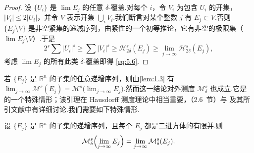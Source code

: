 \begin{proof}
设 $\{U_i\}$ 是 $\lim E_j$ 的任意 $\delta$-覆盖.对每个 $i$，令 $V_i$ 为包含 $U_i$ 的开集，$|V_i|\leq 2|U_i|$，并令 $V$ 表示开集 $\bigcup_{i}V_i$.我们断言对某个整数 $j$ 有 $E_j\subset V$.否则 $\{E_j\setminus V\}$ 是非空紧集的递减序列，由紧性的一个初等推论，它有非空的极限集（$\lim E_j\setminus V$）.于是
\[
  2^{s}\sum|U_i|^{s}\geq\sum|V_i|^{s}\geq\mathcal{H}^{s}_{2\delta}(E_j)\geq\lim_{j\to\infty}\mathcal{H}^{s}_{2\delta}(E_j),
\]
考虑 $\lim E_j$ 的所有此类 $\delta$-覆盖即得 \eqref{eq:5.6}.
\end{proof}

若 $\{E_j\}$ 是 $\mathbb{R}^n$ 的子集的任意递增序列，则由\cref{lem:1.3} 有 $\lim_{j\to\infty}\mathcal{M}^s(E_j)=\mathcal{M}^s\bigl(\lim_{j\to\infty}E_j\bigr)$.然而这一结论对外测度 $\mathcal{M}^s_{\delta}$ 也成立.它是的一个特殊情形；该引理在 Hausdorff 测度理论中相当重要，\textcite{rogers1970}（2.6~节）与 \textcite{davies1970} 及其所引文献中有详细讨论.我们需要如下特殊情形.

\begin{lemma}\label{lem:5.3}
设 $\{E_j\}$ 是 $\mathbb{R}^n$ 的子集的递增序列，且每个 $E_j$ 都是二进方体的有限并.则
\[
  \mathcal{M}^{s}_{\delta}\Bigl(\lim_{j\to\infty}E_j\Bigr)=\lim_{j\to\infty}\mathcal{M}^{s}_{\delta}(E_j).
\]
\end{lemma}

